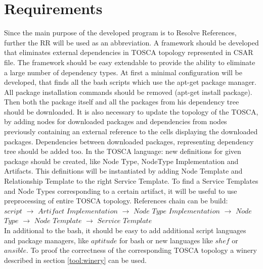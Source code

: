 
\chapter{Requirements}
\label{chap:req}
Since the main purpose of the developed program is to Resolve References, further the RR will be used as an abbreviation. 
A framework should be developed that eliminates external dependencies in TOSCA topology represented in CSAR file.
The framework should be easy extendable to provide the ability to eliminate a large number of dependency types.
At first a minimal configuration will be developed, that finds all the bash scripts which use the apt-get package manager. 
All package installation commands should be removed (apt-get install package).
Then both the package itself and all the packages from his dependency tree should be downloaded.
It is also necessary to update the topology of the TOSCA, by adding nodes for downloaded packages and dependencies from nodes previously containing an external reference to the cells displaying the downloaded packages. Dependencies between downloaded packages, representing dependency tree should be added too.
In the TOSCA language: new definitions for given package should be created, like Node Type, NodeType Implementation and Artifacts. 
This definitions will be instantiated by adding Node Template and Relationship Template to the right Service Template.
To find a Service Templates and Node Types corresponding to a certain artifact, it will be useful to use preprocessing of entire TOSCA topology. References chain can be build:\\
$script$ $\rightarrow$ $Artifact$ $Implementation$ $\rightarrow$ $Node$ $Type$ $Implementation$ $\rightarrow$ $Node$ $Type$ $\rightarrow$ $Node$ $Template$ $\rightarrow$ $Service$ $Template$\\
In additional to the bash, it should be easy to add additional script languages and package managers, like $aptitude$ for bash or new languages like $shef$ or $ansible$.
To proof the correctness of the corresponding TOSCA topology a winery described in section \ref{tool:winery} can be used.
